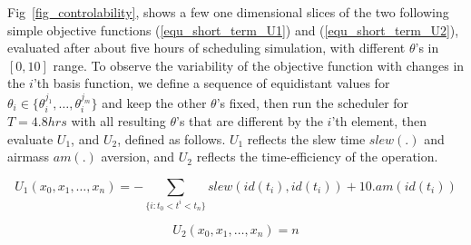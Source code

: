 \documentclass[12pt]{aastex62}
\theoremstyle{definition}
\begin{document}
Fig~\ref{fig_controlability}, shows a few one dimensional slices of the two following simple objective functions (\ref{equ_short_term_U1}) and (\ref{equ_short_term_U2}), evaluated after about five hours of scheduling simulation, with different $\theta$'s in $[0,10]$ range. To observe the variability of the objective function with changes in the $i$'th basis function, we define a sequence of equidistant values for $\theta_i \in \{\theta_i^{j_1},\dots,\theta_i^{j_m}\}$ and keep the other $\theta$'s fixed, then run the scheduler for $T = 4.8 hrs$ with all resulting $\theta$'s that are different by the $i$'th element, then evaluate $U_1$, and $U_2$, defined as follows. $U_1$ reflects the slew time $slew(.)$ and airmass $am(.)$ aversion, and $U_2$ reflects the time-efficiency of the operation.

\begin{equation}\label{equ_short_term_U1}
U_1(x_0,x_{1}, \dots, x_{n})= -\sum_{\{i:t_0<t^i<t_n\}} {slew(id(t_{i}), id(t_i)) + 10 . am(id(t_i))}
\end{equation}

\begin{equation}\label{equ_short_term_U2}
U_2(x_0,x_{1}, \dots, x_{n})= n
\end{equation}
\end{document}
